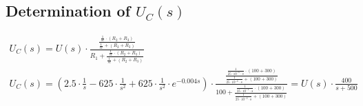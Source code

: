 \documentclass[a4paper]{article}
\begin{document}
\subsection{Determination of $U_C(s)$}
\begin{align*}
	U_C(s) = U(s) \cdot \frac{\frac{\frac{1}{sc}\cdot (R_2+R_3)}{\frac{1}{sc} + (R_2+R_3)}}{R_1 + \frac{\frac{1}{sc}\cdot (R_2+R_3)}{\frac{1}{sc} + (R_2+R_3)}}\\
	U_C(s) = \left(2.5 \cdot \frac{1}{s} - 625 \cdot \frac{1}{s^2} + 625 \cdot \frac{1}{s^2} \cdot e^{-0.004s} \right) \cdot \frac{\frac{\frac{1}{25\cdot10^{-6}\cdot s}\cdot (100+300)}{\frac{1}{25\cdot10^{-6}\cdot s} + (100+300)}}
	{100 + \frac{\frac{1}{25\cdot10^{-6}\cdot s}\cdot (100+300)}{\frac{1}{25\cdot10^{-6}\cdot s} + (100+300)}} =
	U(s) \cdot \frac{400}{s+500}\\
\end{align*}
\end{document}
